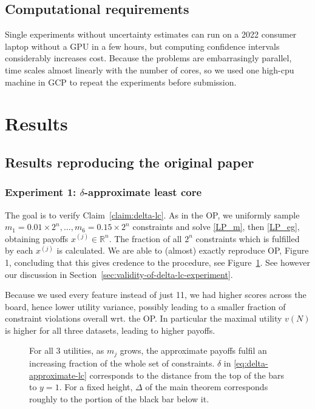 \subsection{Computational requirements}

Single experiments without uncertainty estimates can run on a 2022 consumer
laptop without a GPU in a few hours, but computing confidence intervals
considerably increases cost. Because the problems are embarrasingly parallel,
time scales almost linearly with the number of cores, so we used one high-cpu
machine in GCP to repeat the experiments before submission.

\section{Results}\label{sec:results}

\subsection{Results reproducing the original paper}

\subsubsection{Experiment 1: $\delta$-approximate least
core}\label{sec:result-delta-lc}

The goal is to verify Claim~\ref{claim:delta-lc}. As in the OP, we uniformly
sample $m_1 = 0.01 \times 2^n, \ldots, m_6 = 0.15 \times 2^n$ constraints and
solve \eqref{LP_m}, then \eqref{LP_eg}, obtaining payoffs $x^{(j)} \in
\mathbb{R}^n$. The fraction of all $2^n$ constraints which is fulfilled by
each $x^{(j)}$ is calculated. We are able to (almost) exactly reproduce OP,
Figure 1, concluding that this gives credence to the procedure, see
Figure~\ref{fig:delta-approximation}. See however our discussion in
Section~\ref{sec:validity-of-delta-lc-experiment}.

Because we used every feature instead of just 11, we had higher scores across
the board, hence lower utility variance, possibly leading to a smaller
fraction of constraint violations overall wrt. the OP. In particular the
maximal utility $v (N)$ is higher for all three datasets, leading to higher
payoffs.

\begin{figure}[h]
  \hspace*{-3mm}
  \caption{\label{fig:delta-approximation}For all 3 utilities, as $m_j$ grows,
  the approximate payoffs fulfil an increasing fraction of the whole set of
  constraints. $\delta$ in \eqref{eq:delta-approximate-lc} corresponds to the
  distance from the top of the bars to $y = 1$. For a fixed height, $\Delta$
  of the main theorem corresponds roughly to the portion of the black bar
  below it.}
\end{figure}

